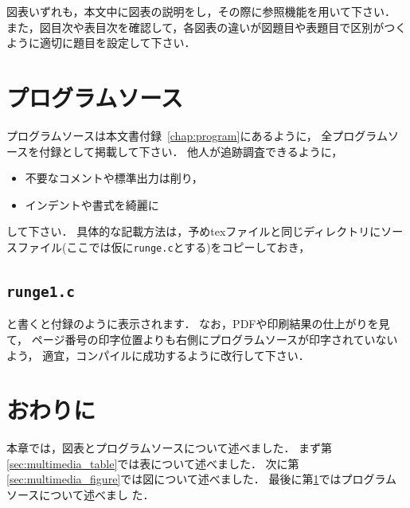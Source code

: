 \documentclass[a4j,12pt,dvipdfmx,oneside]{jsbook}
\theoremstyle{definition}
\begin{document}
図表いずれも，本文中に図表の説明をし，その際に参照機能を用いて下さい．
また，図目次や表目次を確認して，各図表の違いが図題目や表題目で区別がつく
ように適切に題目を設定して下さい．
%
%
%
\section{プログラムソース}\label{sec:multimedia_program}
%
%
%
プログラムソースは本文書付録~\ref{chap:program}にあるように，
全プログラムソースを付録として掲載して下さい．
他人が追跡調査できるように，
\begin{itemize}
\item 不要なコメントや標準出力は削り，
\item インデントや書式を綺麗に
\end{itemize}
して下さい．
具体的な記載方法は，予めtexファイルと同じディレクトリにソースファイル(ここでは仮に\texttt{runge.c}とする)をコピーしておき，
\begin{verbatimtab}
\section*{\texttt{runge1.c}}
\end{verbatimtab}
と書くと付録のように表示されます．
なお，PDFや印刷結果の仕上がりを見て，
ページ番号の印字位置よりも右側にプログラムソースが印字されていないよう，
適宜，コンパイルに成功するように改行して下さい．
%
%
%
\section{おわりに}\label{sec:multimedia_summary}
本章では，図表とプログラムソースについて述べました．
まず第\ref{sec:multimedia_table}では表について述べました．
次に第\ref{sec:multimedia_figure}では図について述べました．
最後に第\ref{sec:multimedia_program}ではプログラムソースについて述べまし
た．
%
%
%
\end{document}
